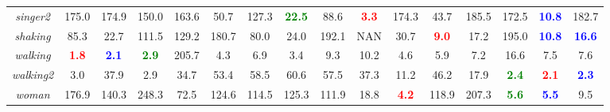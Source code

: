 \documentclass[preprint,12pt,review]{elsarticle}
\begin{document}
\begin{table*}[htp]
{\begin{tabular}{|c|c|c|c|c|c|c|c|c|c|c|c|c|c|c|c|}
%
\emph{singer2}   &175.0  &174.9  &150.0 &163.6  &50.7  &127.3  &\textcolor{green}{\textbf{22.5}}  &88.6  &\textcolor{red}{\textbf{3.3}}  &174.3  &43.7 &185.5 &172.5  &\textcolor{blue}{\textbf{10.8}} &182.7\\
%
\emph{shaking}   &85.3  &22.7  &111.5 &129.2 &180.7  &80.0   &24.0   &192.1  &NAN &30.7  &\textcolor{red}{\textbf{9.0}} &17.2  &195.0  &\textcolor{blue}{\textbf{10.8}} &\textcolor{blue}{\textbf{16.6}}\\
%
\emph{walking}   &\textcolor{red}{\textbf{1.8}}  &\textcolor{blue}{\textbf{2.1}}  &\textcolor{green}{\textbf{2.9}}  &205.7  &4.3 &6.9 &3.4 &9.3 &10.2 &4.6 &5.9 &7.2 &16.6 &7.5  &7.6\\
%
\emph{walking2}   &3.0  &37.9  &2.9 &34.7  &53.4 &58.5  &60.6 &57.5 &37.3 &11.2 &46.2 &17.9 &\textcolor{green}{\textbf{2.4}} &\textcolor{red}{\textbf{2.1}} &\textcolor{blue}{\textbf{2.3}}\\
%
\emph{woman}  &176.9  &140.3  &248.3  &72.5  &124.6   &114.5   &125.3 &111.9  &18.8 &\textcolor{red}{\textbf{4.2}}  &118.9 &207.3 &\textcolor{green}{\textbf{5.6}} &\textcolor{blue}{\textbf{5.5}} &9.5\\
%
\hline
\end{tabular}}
\label{tab:centererror}
\end{table*}
\end{document}
